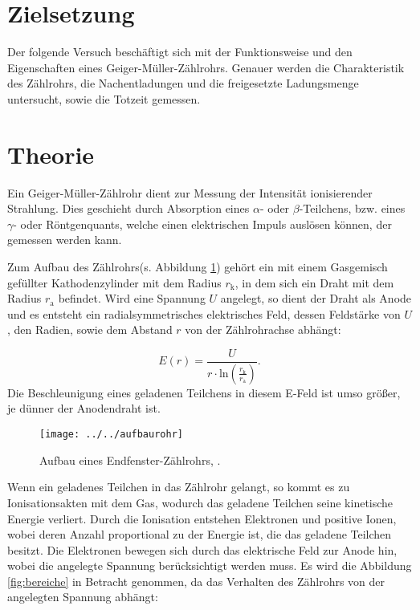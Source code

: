 \section{Zielsetzung}
Der folgende Versuch beschäftigt sich mit der Funktionsweise und den Eigenschaften eines Geiger-Müller-Zählrohrs. Genauer werden die Charakteristik des Zählrohrs, die Nachentladungen und die freigesetzte Ladungsmenge untersucht, sowie die Totzeit gemessen.

\section{Theorie}
Ein Geiger-Müller-Zählrohr dient zur Messung der Intensität ionisierender Strahlung. Dies geschieht durch Absorption eines $\alpha$- oder $\beta$-Teilchens, bzw. eines $\gamma$- oder Röntgenquants, welche einen elektrischen Impuls auslösen können, der gemessen
werden kann.

Zum Aufbau des Zählrohrs(s. Abbildung \ref{fig:aufbaurohr}) gehört ein mit einem Gasgemisch gefüllter Kathodenzylinder mit dem Radius $r_{\text{k}}$, in dem sich ein Draht mit dem Radius $r_{\text{a}}$ befindet. Wird eine Spannung $U$ angelegt, so dient der Draht als Anode und es entsteht ein
radialsymmetrisches elektrisches Feld, dessen Feldstärke von $U$, den Radien, sowie dem Abstand $r$ von der Zählrohrachse abhängt:

\begin{equation*}
E(r) = \frac{U}{r\cdot \text{ln}(\frac{r_{\text{k}}}{r_{\text{a}}})}.
\end{equation*}
Die Beschleunigung eines geladenen Teilchens in diesem E-Feld ist umso größer, je dünner der Anodendraht ist.

\begin{figure}[h!tbp]
	\centering
	\texttt{[image: ../../aufbaurohr]}
	\caption{Aufbau eines Endfenster-Zählrohrs, \cite[1]{anleitung703}. }
	\label{fig:aufbaurohr}
\end{figure}

Wenn ein geladenes Teilchen in das Zählrohr gelangt, so kommt es zu Ionisationsakten mit dem Gas, wodurch das geladene Teilchen seine kinetische Energie verliert. Durch die Ionisation entstehen Elektronen und positive Ionen, wobei deren Anzahl proportional
zu der Energie ist, die das geladene Teilchen besitzt. Die Elektronen bewegen sich durch das elektrische Feld zur Anode hin, wobei die angelegte Spannung berücksichtigt werden muss. Es wird die Abbildung \ref{fig:bereiche} in Betracht genommen, da das Verhalten des Zählrohrs von der angelegten Spannung abhängt:

